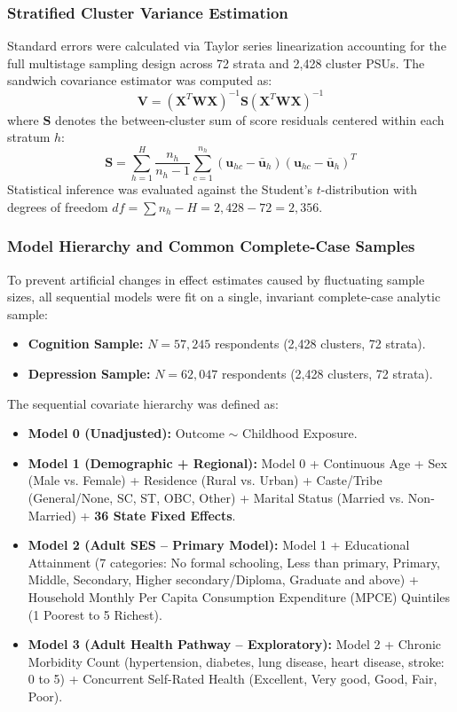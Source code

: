 \documentclass[11pt,a4paper]{article}
\begin{document}
\subsubsection{Stratified Cluster Variance Estimation}
Standard errors were calculated via Taylor series linearization accounting for the full multistage sampling design across 72 strata and 2,428 cluster PSUs. The sandwich covariance estimator was computed as:
\begin{equation}
    \mathbf{V} = \left( \mathbf{X}^T \mathbf{W} \mathbf{X} \right)^{-1} \mathbf{S} \left( \mathbf{X}^T \mathbf{W} \mathbf{X} \right)^{-1}
\end{equation}
where $\mathbf{S}$ denotes the between-cluster sum of score residuals centered within each stratum $h$:
\begin{equation}
    \mathbf{S} = \sum_{h=1}^{H} \frac{n_h}{n_h - 1} \sum_{c=1}^{n_h} \left( \mathbf{u}_{hc} - \bar{\mathbf{u}}_h \right) \left( \mathbf{u}_{hc} - \bar{\mathbf{u}}_h \right)^T
\end{equation}
Statistical inference was evaluated against the Student's $t$-distribution with degrees of freedom $df = \sum n_h - H = 2,428 - 72 = 2,356$.

\subsubsection{Model Hierarchy and Common Complete-Case Samples}
To prevent artificial changes in effect estimates caused by fluctuating sample sizes, all sequential models were fit on a single, invariant complete-case analytic sample:
\begin{itemize}
    \item \textbf{Cognition Sample:} $N = 57,245$ respondents (2,428 clusters, 72 strata).
    \item \textbf{Depression Sample:} $N = 62,047$ respondents (2,428 clusters, 72 strata).
\end{itemize}
The sequential covariate hierarchy was defined as:
\begin{itemize}
    \item \textbf{Model 0 (Unadjusted):} Outcome $\sim$ Childhood Exposure.
    \item \textbf{Model 1 (Demographic + Regional):} Model 0 + Continuous Age + Sex (Male vs. Female) + Residence (Rural vs. Urban) + Caste/Tribe (General/None, SC, ST, OBC, Other) + Marital Status (Married vs. Non-Married) + \textbf{36 State Fixed Effects}.
    \item \textbf{Model 2 (Adult SES -- Primary Model):} Model 1 + Educational Attainment (7 categories: No formal schooling, Less than primary, Primary, Middle, Secondary, Higher secondary/Diploma, Graduate and above) + Household Monthly Per Capita Consumption Expenditure (MPCE) Quintiles (1 Poorest to 5 Richest).
    \item \textbf{Model 3 (Adult Health Pathway -- Exploratory):} Model 2 + Chronic Morbidity Count (hypertension, diabetes, lung disease, heart disease, stroke: 0 to 5) + Concurrent Self-Rated Health (Excellent, Very good, Good, Fair, Poor).
\end{itemize}
\end{document}
